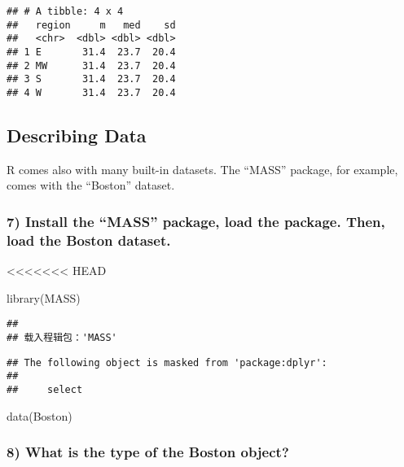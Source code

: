 \documentclass[
  12pt,
]{article}
\newenvironment{Shaded}{\begin{snugshade}}{\end{snugshade}}
\newcommand{\FunctionTok}[1]{\textcolor[rgb]{0.00,0.00,0.00}{#1}}
\newcommand{\NormalTok}[1]{#1}
\begin{document}
\begin{verbatim}
## # A tibble: 4 x 4
##   region     m   med    sd
##   <chr>  <dbl> <dbl> <dbl>
## 1 E       31.4  23.7  20.4
## 2 MW      31.4  23.7  20.4
## 3 S       31.4  23.7  20.4
## 4 W       31.4  23.7  20.4
\end{verbatim}

\hypertarget{describing-data}{%
\subsection{Describing Data}\label{describing-data}}

R comes also with many built-in datasets. The ``MASS'' package, for
example, comes with the ``Boston'' dataset.

\hypertarget{install-the-mass-package-load-the-package.-then-load-the-boston-dataset.}{%
\subsubsection{7) Install the ``MASS'' package, load the package. Then,
load the Boston
dataset.}\label{install-the-mass-package-load-the-package.-then-load-the-boston-dataset.}}

\textless\textless\textless\textless\textless\textless\textless{} HEAD

\begin{Shaded}
\begin{Highlighting}[]
\FunctionTok{library}\NormalTok{(MASS)}
\end{Highlighting}
\end{Shaded}

\begin{verbatim}
## 
## 载入程辑包：'MASS'
\end{verbatim}

\begin{verbatim}
## The following object is masked from 'package:dplyr':
## 
##     select
\end{verbatim}

\begin{Shaded}
\begin{Highlighting}[]
\FunctionTok{data}\NormalTok{(Boston)}
\end{Highlighting}
\end{Shaded}

\hypertarget{what-is-the-type-of-the-boston-object}{%
\subsubsection{8) What is the type of the Boston
object?}\label{what-is-the-type-of-the-boston-object}}
\end{document}
